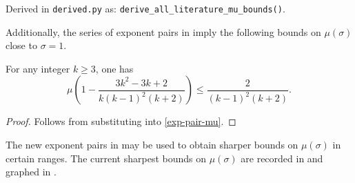 Derived in \texttt{derived.py} as: \texttt{derive\_all\_literature\_mu\_bounds()}.

Additionally, the series of exponent pairs in  imply the following bounds on $\mu(\sigma)$ close to $\sigma = 1$. 
\begin{theorem}\label{hb_mu_bounds}
For any integer $k \ge 3$, one has
\[
\mu\left(1 - \frac{3 k^2 - 3 k + 2}{k(k - 1)^2(k + 2)}\right)\le \frac{2}{(k - 1)^2(k + 2)}.
\]
\end{theorem}
\begin{proof}
Follows from substituting  into \eqref{exp-pair-mu}.
\end{proof}


The new exponent pairs in  may be used to obtain sharper bounds on $\mu(\sigma)$ in certain ranges. The current sharpest bounds on $\mu(\sigma)$ are recorded in  and graphed in .


